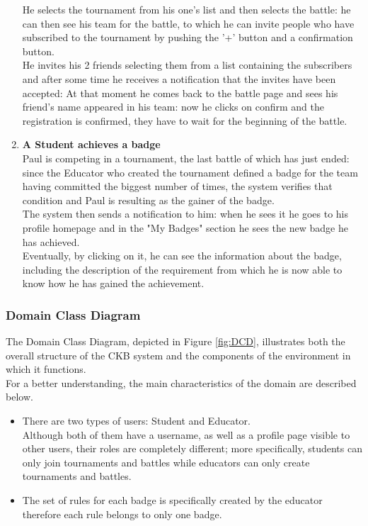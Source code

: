 \documentclass{article}
\begin{document}
\begin{enumerate}
  He selects the tournament from his one's list and then selects the battle: he can then see his team for the battle, to which he can invite people who have subscribed to the tournament by pushing the '+' button and a confirmation button.\\
  He invites his 2 friends selecting them from a list containing the subscribers and after some time he receives a notification that the invites have been accepted: At that moment he comes back to the battle page and sees his friend's name 
  appeared in his team: now he clicks on confirm and the registration is confirmed, they have to wait for the beginning of the battle.
  \newpage 
  \item \textbf{A Student achieves a badge\\} Paul is competing in a tournament, the last battle of which has just ended: since the Educator who created the tournament defined a badge for the team 
  having committed the biggest number of times, the system verifies that condition and Paul is resulting as the gainer of the badge.\\
  The system then sends a notification to him: when he sees it he goes to his profile homepage and in the "My Badges" section he sees the new badge he has achieved.\\
  Eventually, by clicking on it, he can see the information about the badge, including the description of the requirement from which he is now able to know
  how he has gained the achievement.
\end{enumerate}

\newpage

\subsubsection{Domain Class Diagram}
The Domain Class Diagram, depicted in Figure \ref{fig:DCD}, illustrates both the overall structure of the CKB system and the components of the environment in which it functions.\\
For a better understanding, the main characteristics of the domain are described below.\\
\begin{itemize}
    \item There are two types of users: Student and Educator.\\
    Although both of them have a username, as well as a profile page visible to other users, their roles are completely different; more specifically, students can only join tournaments and battles while educators can only create tournaments and battles.
    \item The set of rules for each badge is specifically created by the educator therefore each rule belongs to only one badge.
\end{itemize}
\end{document}
